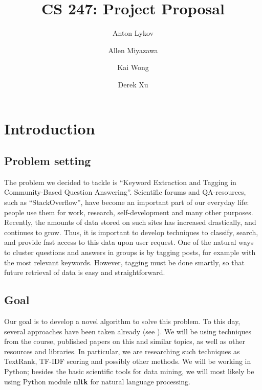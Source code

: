 \documentclass[sigconf,nonacm=True,10pt]{acmart}
\begin{document}
%
\title{CS 247: Project Proposal}

%
\author{Anton Lykov}
\author{Allen Miyazawa}
\author{Kai Wong}
\author{Derek Xu}


\maketitle
\section{Introduction}
\subsection{Problem setting}
The problem we decided to tackle is ``Keyword Extraction and Tagging in Community-Based Question Answering''. Scientific forums and QA-resources, such as ``StackOverflow'', have become an important part of our everyday life: people use them for work, research, self-development and many other purposes. Recently, the amounts of data stored on such sites has increased drastically, and continues to grow. Thus, it is important to develop techniques to classify, search, and provide fast access to this data upon user request. One of the natural ways to cluster questions and answers in groups is by tagging posts, for example with the most relevant keywords. However, tagging must be done smartly, so that future retrieval of data is easy and straightforward. 

\subsection{Goal}
Our goal is to develop a novel algorithm to solve this problem. To this day, several approaches have been taken already (see \cite{beliga2014keyword}). We will be using techniques from the course, published papers on this and similar topics, as well as other resources and libraries. In particular, we are researching such techniques as TextRank, TF-IDF scoring and possibly other methods. 
We will be working in Python; besides the basic scientific tools for data mining, we will most likely be using Python module \textbf{nltk} for natural language processing.
\end{document}

